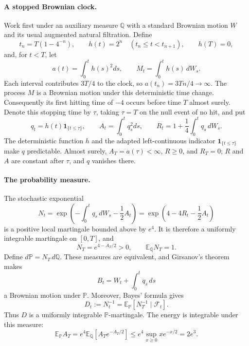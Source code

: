 \documentclass[11pt]{article}
\newcommand{\E}{\mathbb E}
\newcommand{\Pp}{\mathbb P}
\newcommand{\Q}{\mathbb Q}
\begin{document}
\paragraph{A stopped Brownian clock.}
Work first under an auxiliary measure $\Q$ with a standard Brownian motion $W$ and its usual augmented natural filtration. Define
\[
 t_n=T(1-4^{-n}),\qquad h(t)=2^n\quad(t_n\leq t<t_{n+1}),
 \qquad h(T)=0,
\]
and, for $t<T$, let
\[
 a(t)=\int_0^t h(s)^2ds,\qquad M_t=\int_0^t h(s)\,dW_s.
\]
Each interval contributes $3T/4$ to the clock, so $a(t_n)=3Tn/4\to\infty$. The process $M$ is a Brownian motion under this deterministic time change. Consequently its first hitting time of $-4$ occurs before time $T$ almost surely. Denote this stopping time by $\tau$, taking $\tau=T$ on the null event of no hit, and put
\begin{equation}\label{eq:stopped}
 q_t=h(t)\mathbf1_{\{t\leq\tau\}},\qquad
 A_t=\int_0^t q_s^2ds,\qquad
 R_t=1+\frac14\int_0^t q_s\,dW_s.
\end{equation}
The deterministic function $h$ and the adapted left-continuous indicator $\mathbf1_{\{t\leq\tau\}}$ make $q$ predictable. Almost surely, $A_T=a(\tau)<\infty$, $R\geq0$, and $R_T=0$; $R$ and $A$ are constant after $\tau$, and $q$ vanishes there.

\paragraph{The probability measure.}
The stochastic exponential
\begin{equation}\label{eq:density}
 N_t=\exp\left(-\int_0^t q_s\,dW_s-\frac12A_t\right)
     =\exp\left(4-4R_t-\frac12A_t\right)
\end{equation}
is a positive local martingale bounded above by $e^4$. It is therefore a uniformly integrable martingale on $[0,T]$, and
\[
 N_T=e^{4-A_T/2}>0,\qquad \E_{\Q}N_T=1.
\]
Define $d\Pp=N_T\,d\Q$. These measures are equivalent, and Girsanov's theorem makes
\[
 B_t=W_t+\int_0^t q_s\,ds
\]
a Brownian motion under $\Pp$. Moreover, Bayes' formula gives
\begin{equation}\label{eq:reciprocal}
 D_t:=N_t^{-1}=\E_{\Pp}[N_T^{-1}\mid\mathcal F_t].
\end{equation}
Thus $D$ is a uniformly integrable $\Pp$-martingale. The energy is integrable under this measure:
\begin{equation}\label{eq:energy}
 \E_{\Pp}A_T=e^4\E_{\Q}[A_Te^{-A_T/2}]
 \leq e^4\sup_{x\geq0}xe^{-x/2}=2e^3.
\end{equation}
\end{document}
